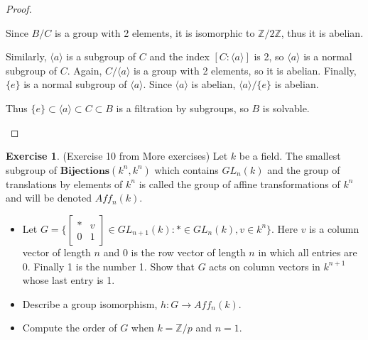 \documentclass[12pt, psamsfonts]{amsart}
\theoremstyle{definition}
\newtheorem*{exer}{Exercise}
\theoremstyle{remark}
\numberwithin{equation}{section}
\begin{document}
\begin{proof}
\begin{itemize}
      Since $B / C$ is a group with 2 elements, it is isomorphic to $\mathbb{Z}/2\mathbb{Z}$, thus it is abelian.

      Similarly, $\langle a \rangle$ is a subgroup of $C$ and the index $[C:\langle a \rangle]$ is 2, so $\langle a \rangle$ is a normal subgroup of $C$.
      Again, $C / \langle a \rangle$ is a group with 2 elements, so it is abelian.
      Finally, $\{ e \}$ is a normal subgroup of $\langle a \rangle$.
      Since $\langle a \rangle$ is abelian, $\langle a \rangle / \{ e \}$ is abelian.

      Thus $\{ e \} \subset \langle a \rangle \subset C \subset B$ is a filtration by subgroups, so $B$ is solvable.
  \end{itemize}
\end{proof}

\begin{exer}{(Exercise 10 from More exercises)}
  Let $k$ be a field.
  The smallest subgroup of $\textbf{Bijections}(k^n, k^n)$ which contains $GL_n(k)$ and the group of translations by elements of $k^n$ is called the group of affine transformations of $k^n$ and will be denoted $Aff_n(k)$.
  \begin{itemize}
    \item
      Let $G = \{ \begin{bmatrix} * & v \\ 0 & 1 \end{bmatrix} \in GL_{n + 1}(k): * \in GL_n(k), v \in k^n \}$.
      Here $v$ is a column vector of length $n$ and $0$ is the row vector of length $n$ in which all entries are 0.
      Finally 1 is the number 1.
      Show that $G$ acts on column vectors in $k^{n + 1}$ whose last entry is 1.
    \item
      Describe a group isomorphism, $h: G \rightarrow Aff_n(k)$.
    \item
      Compute the order of $G$ when $k = \mathbb{Z} / p$ and $n = 1$.
  \end{itemize}
\end{exer}
\end{document}
